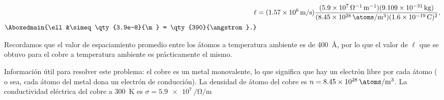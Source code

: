 \documentclass[./../main.tex]{subfiles}
\begin{document}
\begin{enumerate}
\begin{enumerate}[label = (b.\arabic*)]
                        \begin{align*}
                            \ell &= (\qty[per-mode=symbol]{1.57e6}{\m\per\s})\dfrac{(\qty[per-mode=power]{5.9e7}{\per\ohm\per\m})(\qty{9.109e-31}{\kg})}{(\qty[per-mode=symbol]{8.45e28}{\atoms\per\m\cubed})(\qty{1.6e-19}{\C})^{2}},\\
                            \Aboxedmain{\ell &\simeq \qty{3.9e-8}{\m} = \qty{390}{\angstrom}.}
                        \end{align*}

                        Recordamos que el valor de espaciamiento promedio entre los átomos a temperatura ambiente es de \qty{400}{\angstrom}, por lo que el valor de \(\ell\) que se obtuvo para el cobre a temperatura ambiente es prácticamente el mismo.
                \end{enumerate}

                \color{blue}
                Información útil para resolver este problema: el cobre es un metal monovalente, lo que significa que hay un electrón libre por cada átomo ( o sea, cada átomo del metal dona un electrón de conducción). La densidad de átomo del cobre es \(n = \qty{8.45e28}{\atoms\per\m\cubed}\). La conductividad eléctrica del cobre a \qty{300}{\K} es \(\sigma = \qty[per-mode=power]{5.9e7}{\per\ohm\per\m}\)
        \end{enumerate}
\end{document}
